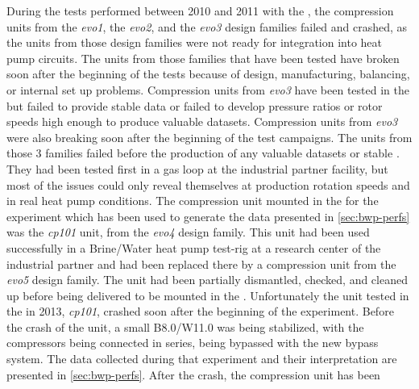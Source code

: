During the tests performed between 2010 and 2011 with the \BWP{}, the
compression units from the \textit{evo1}, the \textit{evo2}, and the
\textit{evo3} design families failed and crashed, as the units from
those design families were not ready for integration into heat pump
circuits. The units from those families that have been tested have
broken soon after the beginning of the tests because of design,
manufacturing, balancing, or internal set up problems. Compression
units from \textit{evo3} have been tested in the \BWP{} but failed to
provide stable data or failed to develop pressure ratios or rotor
speeds high enough to produce valuable datasets. Compression units
from \textit{evo3} were also breaking soon after the beginning of the
test campaigns. The units from those 3 families failed before the
production of any valuable datasets or stable \OP{}. They had been
tested first in a gas loop at the industrial partner facility, but
most of the issues could only reveal themselves at production rotation
speeds and in real heat pump conditions. The compression unit
mounted in the \BWP{} for the experiment which has been used to
generate the data presented in \cref{sec:bwp-perfs} was the
\textit{cp101} unit, from the \textit{evo4} design
family. This unit had been used successfully
in a Brine/Water heat pump test-rig at a research center of the
industrial partner and had been replaced there by a compression unit
from the \textit{evo5} design family. The unit had been partially
dismantled, checked, and cleaned up before being delivered to be
mounted in the \BWP{}. Unfortunately the unit tested in the \BWP{} in 2013,
\textit{cp101}, crashed soon after the beginning of the
experiment. Before the crash of the unit, a small B8.0/W11.0 was being
stabilized, with the compressors being connected in series, being
bypassed with the new bypass system. The data collected during that
experiment and their interpretation are presented in
\cref{sec:bwp-perfs}. After the crash, the compression unit has been
